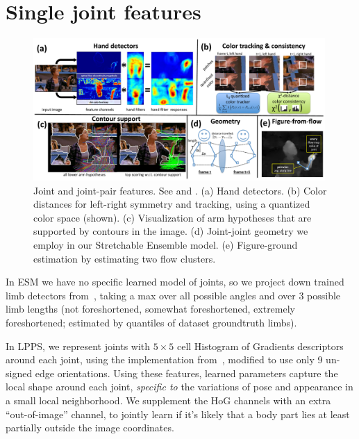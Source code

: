 \section{Single joint features} \label{sec:single-joint}

\begin{figure}[tb]
\begin{center}
\includegraphics[width=0.99\textwidth]{figs/misc-features.pdf}
\caption[Joint and joint-pair features.]{Joint and joint-pair features. See 
 and . (a)  Hand detectors.  (b) Color 
distances for left-right symmetry and tracking, using a quantized color space 
(shown).  (c) Visualization of arm hypotheses that are supported by contours in 
the image.  (d) Joint-joint geometry we employ in our Stretchable Ensemble 
model.  (e)  Figure-ground estimation by estimating two flow clusters.}
\label{fig:misc-features}
\end{center}
\end{figure}



In ESM we have no specific learned model of joints, so we project down trained 
limb detectors from~, taking a max over all possible angles 
and over 3 possible limb lengths (not foreshortened, somewhat foreshortened, 
extremely foreshortened; estimated by quantiles of dataset groundtruth limbs).

In LPPS, we represent joints with $5 \times 5$ cell Histogram of Gradients 
descriptors around each joint, using the implementation from~\cite{dpm}, 
modified to use only 9 un-signed edge orientations.  Using these features, 
learned parameters capture the local shape around each joint, {\em specific to} 
the variations of pose and appearance in a small local neighborhood.  We 
supplement the HoG channels with an extra ``out-of-image'' channel, to jointly 
learn if it's likely that a body part lies at least partially outside the image 
coordinates.

